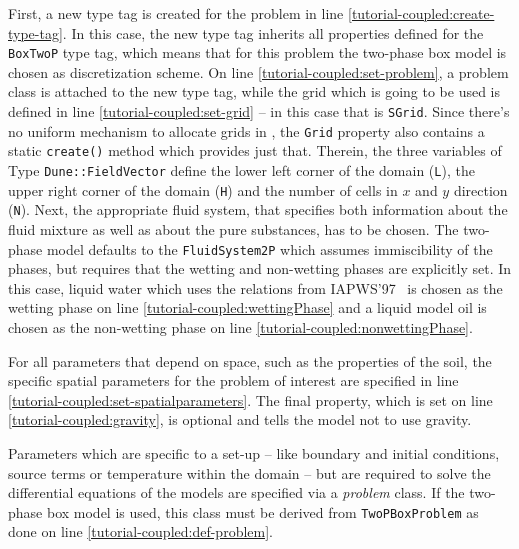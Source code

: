 \begin{lst}\label{tutorial-coupled:problemfile} \mbox{}

\end{lst}

First, a new type tag is created for the problem in line
\ref{tutorial-coupled:create-type-tag}.  In this case, the new type
tag inherits all properties defined for the \texttt{BoxTwoP} type tag,
which means that for this problem the two-phase box model is chosen as
discretization scheme. On line \ref{tutorial-coupled:set-problem}, a
problem class is attached to the new type tag, while the grid which
is going to be used is defined in line \ref{tutorial-coupled:set-grid} --
in this case that is  \texttt{SGrid}.  Since there's no uniform
mechanism to allocate grids in \Dune, the \texttt{Grid} property also contains
a static \texttt{create()} method which provides just that. Therein, the three variables of 
Type \texttt{Dune::FieldVector} define the lower left corner of the domain 
(\texttt{L}), the upper right corner of the domain (\texttt{H}) and the number 
of cells in $x$ and $y$ direction (\texttt{N}). Next,
the appropriate fluid system, that specifies both information about
the fluid mixture as well as about the pure substances, has to be chosen. 
The two-phase model defaults to the \texttt{FluidSystem2P} which assumes 
immiscibility of the phases, but requires that the wetting and non-wetting phases
are explicitly set. In this case, liquid water which uses the relations from 
IAPWS'97~\cite{IAPWS1997} is chosen as the wetting phase on line
\ref{tutorial-coupled:wettingPhase} and a liquid model oil is chosen as the 
non-wetting phase on line \ref{tutorial-coupled:nonwettingPhase}. 

For all parameters that depend on space, such as the properties of the
 soil, the specific spatial 
parameters for the problem of interest are specified in line
\ref{tutorial-coupled:set-spatialparameters}. The final property, which is set on line
\ref{tutorial-coupled:gravity}, is optional and tells the model not to
use gravity.

Parameters which are specific to a set-up -- like boundary and initial
conditions, source terms or temperature within the domain -- but are
required to solve the differential equations of the models are
specified via a \textit{problem} class. If the two-phase box model is
used, this class must be derived from \texttt{TwoPBoxProblem} as done
on line \ref{tutorial-coupled:def-problem}.

